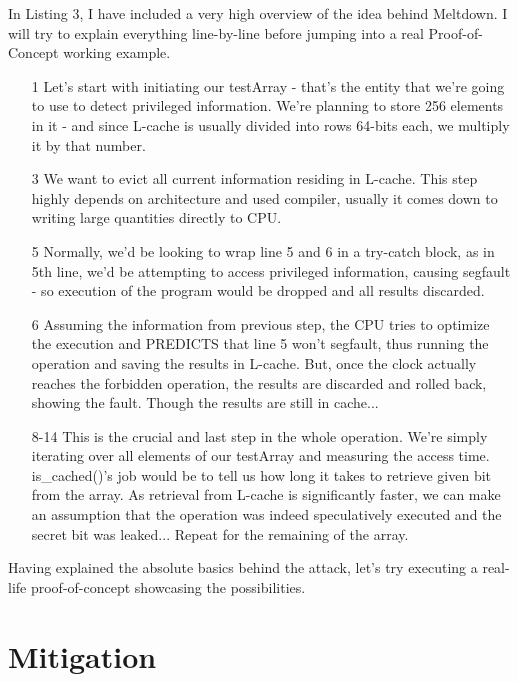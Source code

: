 \documentclass{article}
\begin{document}
In Listing 3, I have included a very high overview of the idea behind Meltdown. I will try to explain everything line-by-line before jumping into a real Proof-of-Concept working example.
\begin{enumerate}

  \item [1] Let's start with initiating our testArray - that's the entity that we're going to use to detect privileged information. We're planning to store 256 elements in it - and since L-cache is usually divided into rows 64-bits each, we multiply it by that number. 
  \item [3] We want to evict all current information residing in L-cache. This step highly depends on architecture and used compiler, usually it comes down to writing large quantities directly to CPU.
  \item [5] Normally, we'd be looking to wrap line 5 and 6 in a try-catch block, as in 5th line, we'd be attempting to access privileged information, causing segfault - so execution of the program would be dropped and all results discarded.
  \item [6] Assuming the information from previous step, the CPU tries to optimize the execution and PREDICTS that line 5 won't segfault, thus running the operation and saving the results in L-cache. But, once the clock actually reaches the forbidden operation, the results are discarded and rolled back, showing the fault. Though the results are still in cache...
  \item [8-14] This is the crucial and last step in the whole operation. We're simply iterating over all elements of our testArray and measuring the access time. is\_cached()'s job would be to tell us how long it takes to retrieve given bit from the array. As retrieval from L-cache is significantly faster, we can make an assumption that the operation was indeed speculatively executed and the secret bit was leaked... Repeat for the remaining of the array.

\end{enumerate}

Having explained the absolute basics behind the attack, let's try executing a real-life proof-of-concept showcasing the possibilities. 

\section{Mitigation}



 
\end{document}
